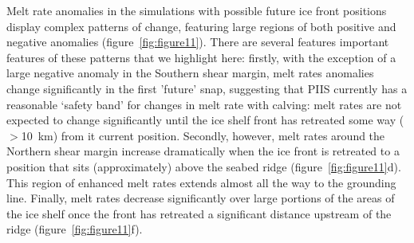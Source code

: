 \documentclass[draft]{agujournal2019}
\begin{document}
Melt rate anomalies in the simulations with possible future ice front positions display complex patterns of change, featuring large regions of both positive and negative anomalies (figure~\ref{fig:figure11}). There are several features important features of these patterns that we highlight here: firstly, with the exception of a large negative anomaly in the Southern shear margin, melt rates anomalies change significantly in the first 'future' snap, suggesting that PIIS currently has a reasonable `safety band' for changes in melt rate with calving: melt rates are not expected to change significantly until the ice shelf front has retreated some way ($>$10~km) from it current position. Secondly, however, melt rates around the Northern shear margin increase dramatically when the ice front is retreated to a position that sits (approximately) above the seabed ridge (figure~\ref{fig:figure11}d). This region of enhanced melt rates extends almost all the way to the grounding line.  Finally, melt rates decrease significantly over large portions of the areas of the ice shelf once the front has retreated a significant distance upstream of the ridge (figure~\ref{fig:figure11}f).
\end{document}
